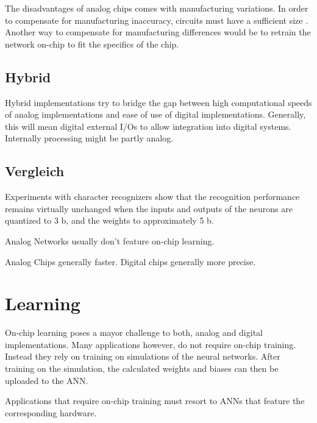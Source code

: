 \documentclass[conference]{IEEEtran}
\begin{document}
    The disadvantages of analog chips comes with manufacturing variations.
    In order to compensate for manufacturing inaccuracy, circuits must have a sufficient size \cite{forssell2014hardware}.
    Another way to compensate for manufacturing differences would be to retrain the network on-chip to fit the specifics of the chip.

    \subsection{Hybrid}

    Hybrid implementations try to bridge the gap between high computational speeds of analog implementations and ease of use of digital implementations.
    Generally, this will mean digital external I/Os to allow integration into digital systems.
    Internally processing might be partly analog.

    \subsection{Vergleich}
    Experiments with character recognizers show that the recognition performance remains virtually unchanged when the inputs and outputs of
    the neurons are quantized to 3 b, and the weights to approximately 5 b. \cite{boser1991analog}

    Analog Networks usually don't feature on-chip learning. \cite{ms1990digital}

    Analog Chips generally faster.
    Digital chips generally more precise.

    \section{Learning}

    On-chip learning poses a mayor challenge to both, analog and digital implementations.
    Many applications however, do not require on-chip training.
    Instead they rely on training on simulations of the neural networks.
    After training on the simulation, the calculated weights and biases can then be uploaded to the ANN\@.

    Applications that require on-chip training must resort to ANNs that feature the corresponding hardware.


\end{document}
